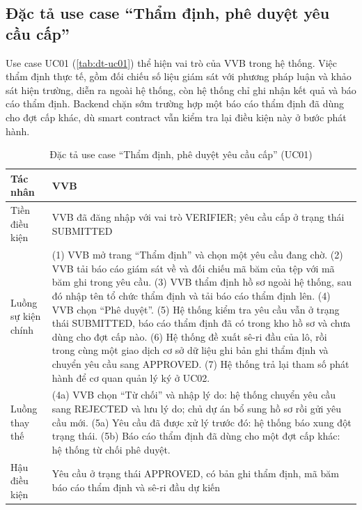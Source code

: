 \subsection*{Đặc tả use case ``Thẩm định, phê duyệt yêu cầu cấp''}
\label{subsec:dt-uc01}

Use case UC01 (\autoref{tab:dt-uc01}) thể hiện vai trò của VVB trong hệ thống. Việc thẩm định thực tế, gồm đối chiếu số liệu giám sát với phương pháp luận và khảo sát hiện trường, diễn ra ngoài hệ thống, còn hệ thống chỉ ghi nhận kết quả và báo cáo thẩm định. Backend chặn sớm trường hợp một báo cáo thẩm định đã dùng cho đợt cấp khác, dù smart contract vẫn kiểm tra lại điều kiện này ở bước phát hành.

\begin{table}[!htbp]
    \centering
    \caption{Đặc tả use case ``Thẩm định, phê duyệt yêu cầu cấp'' (UC01)}
    \label{tab:dt-uc01}
    \small
    \begin{tabularx}{\textwidth}{|L{2.8cm}|Y|}
        \hline
        Tác nhân & VVB \\
        \hline
        Tiền điều kiện & VVB đã đăng nhập với vai trò VERIFIER; yêu cầu cấp ở trạng thái SUBMITTED \\
        \hline
        Luồng sự kiện chính & (1) VVB mở trang ``Thẩm định'' và chọn một yêu cầu đang chờ.\newline
        (2) VVB tải báo cáo giám sát về và đối chiếu mã băm của tệp với mã băm ghi trong yêu cầu.\newline
        (3) VVB thẩm định hồ sơ ngoài hệ thống, sau đó nhập tên tổ chức thẩm định và tải báo cáo thẩm định lên.\newline
        (4) VVB chọn ``Phê duyệt''.\newline
        (5) Hệ thống kiểm tra yêu cầu vẫn ở trạng thái SUBMITTED, báo cáo thẩm định đã có trong kho hồ sơ và chưa dùng cho đợt cấp nào.\newline
        (6) Hệ thống đề xuất sê-ri đầu của lô, rồi trong cùng một giao dịch cơ sở dữ liệu ghi bản ghi thẩm định và chuyển yêu cầu sang APPROVED.\newline
        (7) Hệ thống trả lại tham số phát hành để cơ quan quản lý ký ở UC02. \\
        \hline
        Luồng thay thế & (4a) VVB chọn ``Từ chối'' và nhập lý do: hệ thống chuyển yêu cầu sang REJECTED và lưu lý do; chủ dự án bổ sung hồ sơ rồi gửi yêu cầu mới.\newline
        (5a) Yêu cầu đã được xử lý trước đó: hệ thống báo xung đột trạng thái.\newline
        (5b) Báo cáo thẩm định đã dùng cho một đợt cấp khác: hệ thống từ chối phê duyệt. \\
        \hline
        Hậu điều kiện & Yêu cầu ở trạng thái APPROVED, có bản ghi thẩm định, mã băm báo cáo thẩm định và sê-ri đầu dự kiến \\
        \hline
    \end{tabularx}
\end{table}

